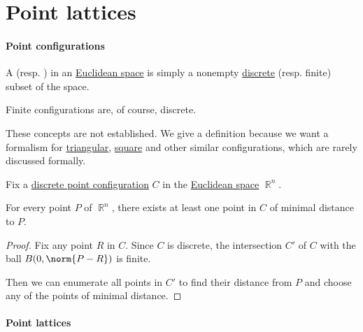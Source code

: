 \section{Point lattices}\label{sec:point_lattices}

\paragraph{Point configurations}

\begin{definition}\label{def:point_configuration}\mimprovised
  A  (resp. )  in an \hyperref[def:euclidean_space]{Euclidean space} is simply a nonempty \hyperref[def:discrete_set]{discrete} (resp. finite) subset of the space.
\end{definition}
\begin{comments}
  \item Finite configurations are, of course, discrete.

  \item These concepts are not established. We give a definition because we want a formalism for \hyperref[def:triangular_point_configuration]{triangular}, \hyperref[def:hypercubic_point_configuration]{square} and other similar configurations, which are rarely discussed formally.
\end{comments}

\begin{proposition}\label{thm:point_configuration_finiteness}
  Fix a \hyperref[def:point_configuration]{discrete point configuration} \( C \) in the \hyperref[def:euclidean_space]{Euclidean space} \( \BbbR^n \).

  For every point \( P \) of \( \BbbR^n \), there exists at least one point in \( C \) of minimal distance to \( P \).
\end{proposition}
\begin{proof}
  Fix any point \( R \) in \( C \). Since \( C \) is discrete, the intersection \( C' \) of \( C \) with the ball \( B(0, \norm{P - R}) \) is finite.

  Then we can enumerate all points in \( C' \) to find their distance from \( P \) and choose any of the points of minimal distance.
\end{proof}

\paragraph{Point lattices}

